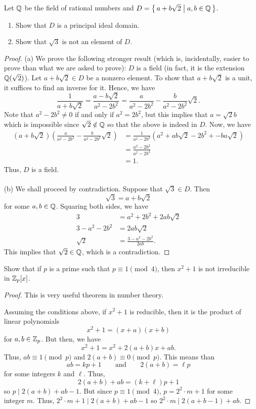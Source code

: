 \begin{problem}
Let $\mathbb{Q}$ be the field of rational numbers and
$D=\left\{\,a+b\sqrt{2}\;\middle|\;a,b\in\mathbb{Q}\,\right\}$.
\begin{enumerate}[label=(\alph*)]
\item Show that $D$ is a principal ideal domain.
\item Show that $\sqrt{3}$ is not an element of $D$.
\end{enumerate}
\end{problem}
\begin{proof}
(a) We prove the following stronger result (which is, incidentally, easier
to prove than what we are asked to prove): $D$ is a field (in fact, it is
the extension $\mathbb{Q}(\sqrt{2})$). Let $a+b\sqrt{2}\in D$ be a nonzero
element. To show that $a+b\sqrt{2}$ is a unit, it suffices to find an
inverse for it. Hence, we have
\[
\frac{1}{a+b\sqrt{2}}=\frac{a-b\sqrt{2}}{a^2-2b^2}=\frac{a}{a^2-2b^2}-\frac{b}{a^2-2b^2}\sqrt{2}.
\]
Note that $a^2-2b^2\neq 0$ if and only if $a^2=2b^2$, but this implies that
$a=\sqrt{2}b$ which is impossible since $\sqrt{2}\notin\mathbb{Q}$ so that the
above is indeed in $D$. Now, we have
\begin{align*}
(a+b\sqrt{2})\left(\frac{a}{a^2-2b^2}-\frac{b}{a^2-2b^2}\sqrt{2}\right)
&=\frac{1}{a^2-2b^2}\left(a^2+ab\sqrt{2}-2b^2+-ba\sqrt{2}\right)\\
&=\frac{a^2-2b^2}{a^2-2b^2}\\
&=1.
\end{align*}
Thus, $D$ is a field.
\\\\
(b) We shall proceed by contradiction. Suppose that $\sqrt{3}\in D$. Then
\[
\sqrt{3}=a+b\sqrt{2}
\]
for some $a,b\in\mathbb{Q}$. Squaring both sides, we have
\begin{align*}
3&=a^2+2b^2+2ab\sqrt{2}\\
3-a^2-2b^2&=2ab\sqrt{2}\\
\sqrt{2}&=\frac{3-a^2-2b^2}{2ab}.
\end{align*}
This implies that $\sqrt{2}\in\mathbb{Q}$, which is a contradiction.
\end{proof}

\begin{problem}
Show that if $p$ is a prime such that $p\equiv 1\pmod{4}$, then $x^2+1$ is
not irreducible in $\mathbb{Z}_p[x]$.
\end{problem}
\begin{proof}
This is very useful theorem in number theory.

Assuming the conditions above, if $x^2+1$ is reducible, then it is the
product of linear polynomials
\[
x^2+1=(x+a)(x+b)
\]
for $a,b\in\mathbb{Z}_p$. But then, we have
\[
x^2+1=x^2+2(a+b)x+ab.
\]
Thus, $ab\equiv 1\pmod{p}$ and $2(a+b)\equiv 0\pmod{p}$. This means than
\[
ab=kp+1
\qquad\text{and}\qquad
2(a+b)=\ell p
\]
for some integers $k$ and $\ell$. Thus,
\[
2(a+b)+ab=(k+\ell)p+1
\]
so $p\mid 2(a+b)+ab-1$. But since $p\equiv 1\pmod{4}$, $p=2^2\cdot m+1$ for
some integer $m$. Thus, $2^2\cdot m+1\mid 2(a+b)+ab-1$ so $2^2\cdot m\mid
2(a+b-1)+ab$.
\end{proof}

